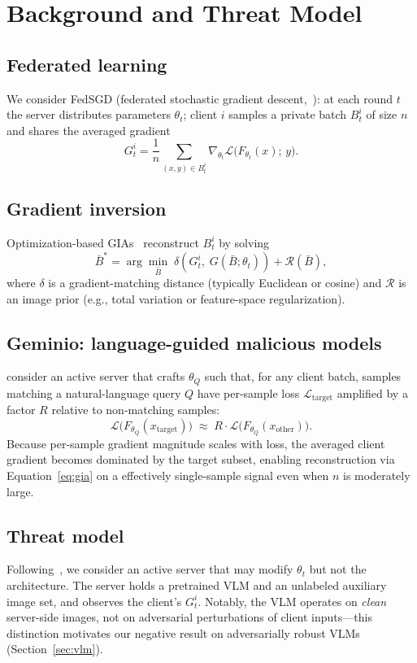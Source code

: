 \documentclass[11pt]{article}
\begin{document}
\section{Background and Threat Model}
\label{sec:background}

\subsection{Federated learning}
We consider FedSGD (federated stochastic gradient descent,~\citealp{fedavg2017}): at each round $t$ the server distributes parameters $\theta_t$; client $i$ samples a private batch $B_t^i$ of size $n$ and shares the averaged gradient
\[
G_t^i = \frac{1}{n} \sum_{(x,y) \in B_t^i} \nabla_{\theta_t} \mathcal{L}\big(F_{\theta_t}(x);\, y\big).
\]

\subsection{Gradient inversion}
Optimization-based GIAs~\citep{dlg2019,ig2020,gradinversion2021} reconstruct $B_t^i$ by solving
\begin{equation}
\bar{B}^* = \arg\min_{\bar{B}}\; \delta\!\left(G_t^i,\; G(\bar{B}; \theta_t)\right) + \mathcal{R}(\bar{B}),
\label{eq:gia}
\end{equation}
where $\delta$ is a gradient-matching distance (typically Euclidean or cosine) and $\mathcal{R}$ is an image prior (e.g., total variation or feature-space regularization).

\subsection{Geminio: language-guided malicious models}
\citet{geminio2024} consider an active server that crafts $\theta_Q$ such that, for any client batch, samples matching a natural-language query $Q$ have per-sample loss $\mathcal{L}_{\text{target}}$ amplified by a factor $R$ relative to non-matching samples:
\[
\mathcal{L}\big(F_{\theta_Q}(x_{\text{target}})\big) \;\approx\; R \cdot \mathcal{L}\big(F_{\theta_Q}(x_{\text{other}})\big).
\]
Because per-sample gradient magnitude scales with loss, the averaged client gradient becomes dominated by the target subset, enabling reconstruction via Equation~\ref{eq:gia} on a effectively single-sample signal even when $n$ is moderately large.

\subsection{Threat model}
Following~\citet{geminio2024,fishing2023}, we consider an active server that may modify $\theta_t$ but not the architecture. The server holds a pretrained VLM and an unlabeled auxiliary image set, and observes the client's $G_t^i$. Notably, the VLM operates on \emph{clean} server-side images, not on adversarial perturbations of client inputs---this distinction motivates our negative result on adversarially robust VLMs (Section~\ref{sec:vlm}).
\end{document}
